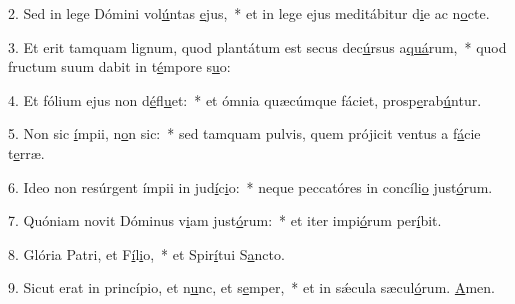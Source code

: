 2. Sed in lege Dómini vol\uline{ú}ntas \uline{e}jus,~* et in lege ejus meditábitur d\uline{i}e ac n\uline{o}cte.\par 
3. Et erit tamquam lignum, quod plantátum est secus dec\uline{ú}rsus a\uline{quá}rum,~* quod fructum suum dabit in t\uline{é}mpore s\uline{u}o:\par 
4. Et fólium ejus non d\uline{é}fl\uline{u}et:~* et ómnia quæcúmque fáciet, prosp\uline{e}rab\uline{ú}ntur.\par 
5. Non sic \uline{í}mpii, n\uline{o}n sic:~* sed tamquam pulvis, quem prójicit ventus a f\uline{á}cie t\uline{e}rræ.\par 
6. Ideo non resúrgent ímpii in jud\uline{í}c\uline{i}o:~* neque peccatóres in concíli\uline{o} just\uline{ó}rum.\par 
7. Quóniam novit Dóminus v\uline{i}am just\uline{ó}rum:~* et iter impi\uline{ó}rum per\uline{í}bit.\par 
8. Glória Patri, et F\uline{í}l\uline{i}o,~* et Spir\uline{í}tui S\uline{a}ncto.\par 
9. Sicut erat in princípio, et n\uline{u}nc, et s\uline{e}mper,~* et in sǽcula sæcul\uline{ó}rum. \uline{A}men.\par 
